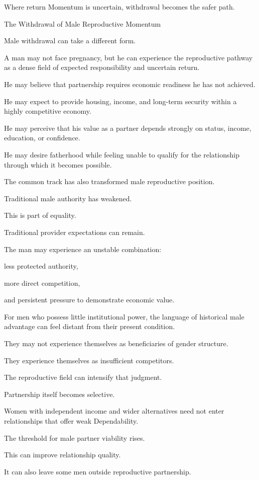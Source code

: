 Where return Momentum is uncertain, withdrawal becomes the safer path.

The Withdrawal of Male Reproductive Momentum

Male withdrawal can take a different form.

A man may not face pregnancy, but he can experience the reproductive pathway as a dense field of expected responsibility and uncertain return.

He may believe that partnership requires economic readiness he has not achieved.

He may expect to provide housing, income, and long-term security within a highly competitive economy.

He may perceive that his value as a partner depends strongly on status, income, education, or confidence.

He may desire fatherhood while feeling unable to qualify for the relationship through which it becomes possible.

The common track has also transformed male reproductive position.

Traditional male authority has weakened.

This is part of equality.

Traditional provider expectations can remain.

The man may experience an unstable combination:

less protected authority,

more direct competition,

and persistent pressure to demonstrate economic value.

For men who possess little institutional power, the language of historical male advantage can feel distant from their present condition.

They may not experience themselves as beneficiaries of gender structure.

They experience themselves as insufficient competitors.

The reproductive field can intensify that judgment.

Partnership itself becomes selective.

Women with independent income and wider alternatives need not enter relationships that offer weak Dependability.

The threshold for male partner viability rises.

This can improve relationship quality.

It can also leave some men outside reproductive partnership.

